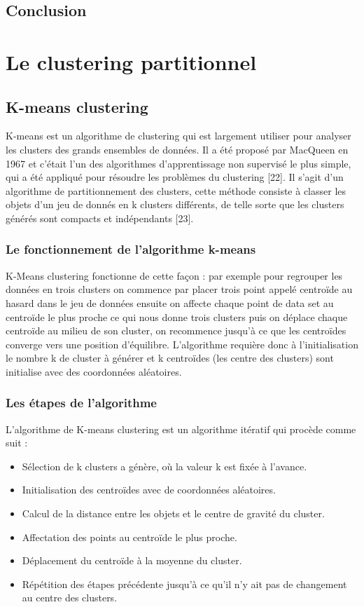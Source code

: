 \subsection{Conclusion}
\section{Le clustering partitionnel}

\subsection{K-means clustering}
K-means est un algorithme de clustering qui est largement utiliser pour analyser les clusters des grands ensembles de données. Il a été proposé par MacQueen en 1967 et c’était l’un des algorithmes d’apprentissage non supervisé le plus simple, qui a été appliqué pour résoudre les problèmes du clustering [22]. Il s'agit d'un algorithme de partitionnement des clusters, cette méthode consiste à classer les objets d’un jeu de donnés en k clusters différents, de telle sorte que les clusters générés sont compacts et indépendants [23].

\subsubsection{Le fonctionnement de l’algorithme k-means}
K-Means clustering fonctionne de cette façon : par exemple pour regrouper les données en trois clusters on commence par placer trois point appelé centroïde au hasard dans le jeu de données ensuite on affecte chaque point de data set au centroïde le plus proche ce qui nous donne trois clusters puis on déplace chaque centroïde au milieu de son cluster, on recommence jusqu’à ce que les centroïdes converge vers une position d’équilibre. L’algorithme requière donc à l’initialisation le nombre k de cluster à générer et k centroïdes (les centre des clusters) sont initialise avec des coordonnées aléatoires.

\subsubsection{Les étapes de l’algorithme}
L’algorithme de K-means clustering est un algorithme itératif qui procède comme suit :

\begin{itemize}
	\item	Sélection de k clusters a génère, où la valeur k est fixée à l'avance.
	\item	Initialisation des centroïdes avec de coordonnées aléatoires.
	\item	Calcul de la distance entre les objets et le centre de gravité du cluster.
	\item	Affectation des points au centroïde le plus proche.
	\item	Déplacement du centroïde à la moyenne du cluster.
	\item	Répétition des étapes précédente jusqu'à ce qu'il n'y ait pas de changement au centre des clusters.
\end{itemize}

